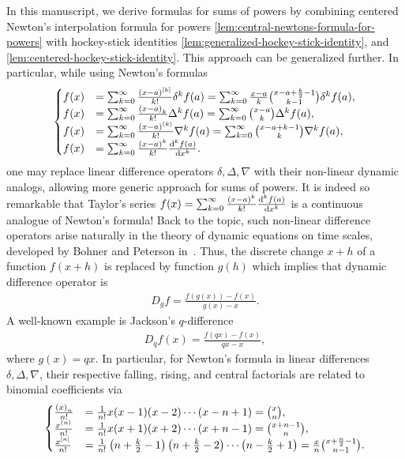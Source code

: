 In this manuscript, we derive formulas for sums of powers by combining
centered Newton's interpolation formula for powers
\eqref{lem:central-newtons-formula-for-powers}
with hockey-stick identities
\eqref{lem:generalized-hockey-stick-identity},
and
\eqref{lem:centered-hockey-stick-identity}.
This approach can be generalized further.
In particular, while using Newton's formulas
\begin{align}
  \label{eq:newtons-formulas-casess}
  \begin{cases}
    f(x)
    &= \sum_{k=0}^{\infty} \frac{(x-a)^{[k]}}{k!} \delta^{k} f(a)
    = \sum_{k=0}^{\infty} \frac{x-a}{k} \binom{x-a+\frac{k}{2}-1}{k-1} \delta^{k} f(a), \\
    f(x)
    &= \sum_{k=0}^{\infty} \frac{\left(x-a\right)_{k}}{k!} \Delta^k f(a)
    = \sum_{k=0}^{\infty} \binom{x-a}{k} \Delta^k f(a), \\
    f(x)
    &= \sum_{k=0}^{\infty} \frac{(x-a)^{\left(k\right)}}{k!} \nabla^k f(a)
    = \sum_{k=0}^{\infty} \binom{x-a+k-1}{k} \nabla^k f(a), \\
    f(x)
    &= \sum_{k=0}^{\infty} \frac{(x-a)^k}{k!} \frac{\mathrm{d}^{k} f(a)}{\mathrm{d} x^{k}}.
  \end{cases}
\end{align}
one may replace
linear difference operators $\delta, \Delta, \nabla$ with their non-linear dynamic
analogs, allowing more generic approach for sums of powers.
It is indeed so remarkable that Taylor's series
$f(x)= \sum_{k=0}^{\infty} \frac{(x-a)^k}{k!} \frac{\mathrm{d}^{k} f(a)}{\mathrm{d} x^{k}}$
is a continuous analogue of Newton's formula!
Back to the topic, such non-linear difference operators arise naturally in the theory of dynamic equations on time scales,
developed by Bohner and Peterson in~\cite{Bohner2001DynamicEO}.
Thus, the discrete change $x+h$ of a function $f(x+h)$ is replaced by function $g(h)$ which
implies that dynamic difference operator is
\begin{align}
  D_g f = \frac{f(g(x)) - f(x)}{g(x) - x}.
  \label{eq:dynamic-difference-operator}
\end{align}
A well-known example is Jackson's $q$-difference~\cite{jackson_1909}
\begin{align*}
  D_q f(x) = \frac{f(qx) - f(x)}{qx - x},
\end{align*}
where $g(x) = qx$.
In particular, for Newton's formula in linear differences $\delta, \Delta, \nabla$, their respective
falling, rising, and central factorials are related
to binomial coefficients via
\begin{align}
  \label{eq:factorial-identities}
  \begin{cases}
    \frac{\left(x\right)_{n}}{n!} &= \frac{1}{n!} x(x-1)(x-2)\cdots(x-n+1) =\binom{x}{n}, \\
    \frac{x^{\left(n\right)}}{n!}  &= \frac{1}{n!} x(x+1)(x+2)\cdots(x+n-1)  =\binom{x+n-1}{n}, \\
    \frac{x^{[n]}}{n!} &= \frac{1}{n!} \left( n + \frac{k}{2} -1 \right)\left( n + \frac{k}{2} -2 \right)
    \cdots \left( n - \frac{k}{2} +1 \right)  =\frac{x}{n} \binom{x+\frac{n}{2}-1}{n-1}.
  \end{cases}
\end{align}
